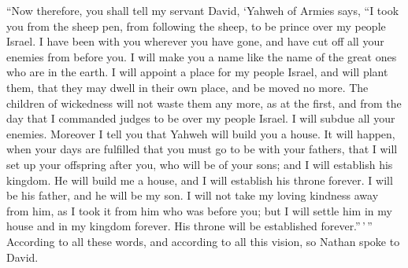  ``Now therefore, you shall tell my servant David, `Yahweh
of Armies says, ``I took you from the sheep pen, from following the
sheep, to be prince over my people Israel.  I have been
with you wherever you have gone, and have cut off all your enemies from
before you. I will make you a name like the name of the great ones who
are in the earth.  I will appoint a place for my people
Israel, and will plant them, that they may dwell in their own place, and
be moved no more. The children of wickedness will not waste them any
more, as at the first,  and from the day that I commanded
judges to be over my people Israel. I will subdue all your enemies.
Moreover I tell you that Yahweh will build you a house. 
It will happen, when your days are fulfilled that you must go to be with
your fathers, that I will set up your offspring after you, who will be
of your sons; and I will establish his kingdom.  He will
build me a house, and I will establish his throne forever.
 I will be his father, and he will be my son. I will not
take my loving kindness away from him, as I took it from him who was
before you;  but I will settle him in my house and in my
kingdom forever. His throne will be established forever.''\,'\,''
 According to all these words, and according to all this
vision, so Nathan spoke to David.

